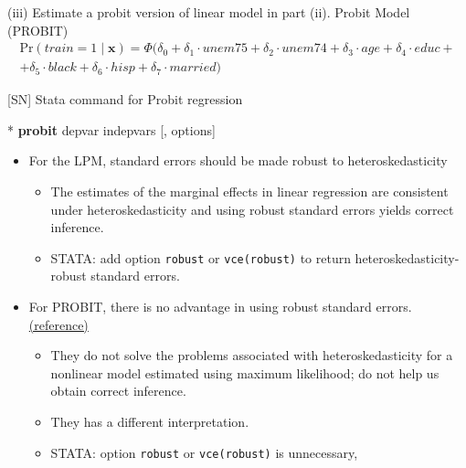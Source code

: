 \documentclass[
  10pt,
  ignorenonframetext,
]{beamer}
\newenvironment{Shaded}{\begin{snugshade}}{\end{snugshade}}
\newcommand{\KeywordTok}[1]{\textcolor[rgb]{0.13,0.29,0.53}{\textbf{#1}}}
\newcommand{\NormalTok}[1]{#1}
\providecommand{\tightlist}{%
  \setlength{\itemsep}{0pt}\setlength{\parskip}{0pt}}
\begin{document}
\begin{frame}{(iii) Estimate a probit version of linear model in part
(ii).}
\protect\hypertarget{iii-estimate-a-probit-version-of-linear-model-in-part-ii.}{}
Probit Model (PROBIT) \small \[
\begin{aligned}
\text{Pr}(train = 1 \mid \mathbf{x}) = \Phi(\delta_0 + \delta_1 \cdot unem75 + \delta_2 \cdot unem74 + \delta_3 \cdot age + \delta_4 \cdot educ +\\
+ \delta_5 \cdot black + \delta_6 \cdot hisp + \delta_7 \cdot married)
\end{aligned}
\]
\end{frame}

\begin{frame}[fragile]{{[}SN{]} Stata command for Probit regression}
\protect\hypertarget{sn-stata-command-for-probit-regression}{}
\small

\begin{Shaded}
\begin{Highlighting}[]
\NormalTok{* }\KeywordTok{probit}\NormalTok{ depvar indepvars [, options]}
\end{Highlighting}
\end{Shaded}

\begin{itemize}
\tightlist
\item
  For the LPM, standard errors should be made robust to
  heteroskedasticity

  \begin{itemize}
  \tightlist
  \item
    The estimates of the marginal effects in linear regression are
    consistent under heteroskedasticity and using robust standard errors
    yields correct inference.
  \item
    STATA: add option \texttt{robust} or \texttt{vce(robust)} to return
    heteroskedasticity-robust standard errors.
  \end{itemize}
\item
  For PROBIT, there is no advantage in using robust standard errors.
  \href{https://blog.stata.com/2016/08/30/two-faces-of-misspecification-in-maximum-likelihood-heteroskedasticity-and-robust-standard-errors/\#disqus_thread}{(reference)}

  \begin{itemize}
  \tightlist
  \item
    They do not solve the problems associated with heteroskedasticity
    for a nonlinear model estimated using maximum likelihood; do not
    help us obtain correct inference.
  \item
    They has a different interpretation.
  \item
    STATA: option \texttt{robust} or \texttt{vce(robust)} is
    unnecessary,
  \end{itemize}
\end{itemize}
\end{frame}
\end{document}

